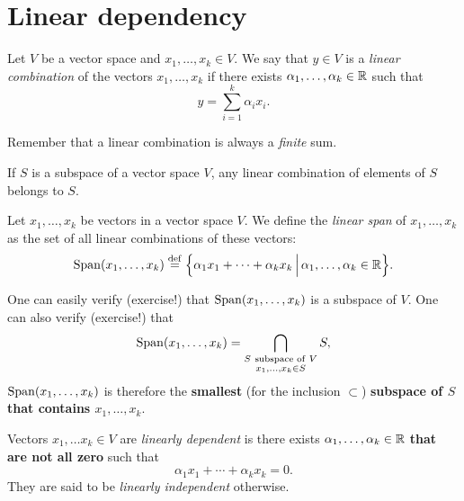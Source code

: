 \documentclass[11pt,nocut]{article}
\begin{document}
\section{Linear dependency}

\begin{definition}
	Let $V$ be a vector space and $x_1, \dots, x_k \in V$. We say that $y \in V$ is a \emph{linear combination} of the vectors $x_1, \dots, x_k$ if there exists $\alpha_1, \dots, \alpha_k \in \mathbb{R}$ such that
	$$
	y = \sum_{i=1}^k \alpha_i x_i.
	$$
\end{definition}

Remember that a linear combination is always a \emph{finite} sum.

\begin{remark}
	If $S$ is a subspace of a vector space $V$, any linear combination of elements of $S$ belongs to $S$.
\end{remark}

\begin{definition}[Span]
	Let $x_1, \dots, x_k$ be vectors in a vector space $V$. We define the \emph{linear span} of $x_1, \dots, x_k$ as the set of all linear combinations of these vectors:
$$
{{\rm Span}}(x_1, \dots, x_k) \overset{\rm def}{=}
\Big\{ \alpha_1 x_1 + \cdots + \alpha_k x_k \, \Big| \, \alpha_1, \dots, \alpha_k \in \mathbb{R} \Big\}.
$$
\end{definition}

One can easily verify (exercise!) that ${{\rm Span}}(x_1,\dots,x_k)$ is a subspace of $V$. One can also verify (exercise!) that
$$
\Span(x_1, \dots, x_k) = \bigcap_{\substack{S \ \text{subspace of} \ V \\ x_1, \dots, x_k \in S}} S,
$$
${{\rm Span}}(x_1,\dots,x_k)$ is therefore the \textbf{smallest} (for the inclusion $\subset$) \textbf{subspace of $S$ that contains $x_1,\dots,x_k$}.

\begin{definition}
	Vectors $x_1, \dots x_k \in V$ are \emph{linearly dependent} is there exists $\alpha_1, \dots, \alpha_k \in \mathbb{R}$ \textbf{that are not all zero} such that 
	$$
	\alpha_1 x_1 + \cdots + \alpha_k x_k = 0.
	$$
	They are said to be \emph{linearly independent} otherwise.
\end{definition}
\end{document}
